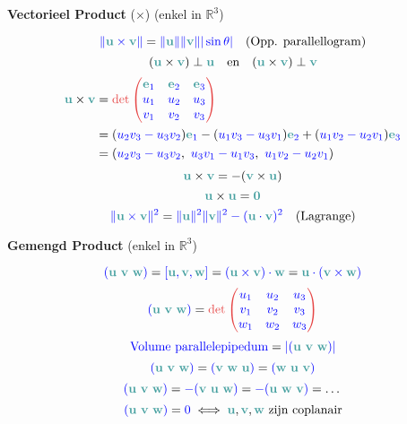 \documentclass[12pt]{article}
\renewcommand{\vec}[1]{\textcolor{vectorTeal}{\mathbf{#1}}}
\newcommand{\evec}[1]{\vec{e}_{\textcolor{scalarBrightBlue}{#1}}}
\newcommand{\scalar}[1]{\textcolor{scalarBrightBlue}{#1}}
\newcommand{\mat}[1]{\textcolor{matrixSoftRed}{#1}}
\begin{document}
\vspace{1.5em} %
{\centering
\textcolor{headerBrown}{\large\textbf{Vectorieel Product} ($\times$) (enkel in $\mathbb{R}^3$)}
\par
}%
\[
\scalar{\|\vec{u} \times \vec{v}\|} = \scalar{\|\vec{u}\| \|\vec{v}\| |\sin \theta|} \quad (\text{Opp. parallellogram})
\]
\[
(\vec{u} \times \vec{v}) \perp \vec{u} \quad \text{en} \quad (\vec{u} \times \vec{v}) \perp \vec{v}
\]
\begin{align*}
\vec{u} \times \vec{v} &= \mat{\det \begin{pmatrix} \evec{1} & \evec{2} & \evec{3} \\ \scalar{u_1} & \scalar{u_2} & \scalar{u_3} \\ \scalar{v_1} & \scalar{v_2} & \scalar{v_3} \end{pmatrix}} \\
&= (\scalar{u_2 v_3 - u_3 v_2})\evec{1} - (\scalar{u_1 v_3 - u_3 v_1})\evec{2} + (\scalar{u_1 v_2 - u_2 v_1})\evec{3} \\
&= (\scalar{u_2 v_3 - u_3 v_2}, \ \scalar{u_3 v_1 - u_1 v_3}, \ \scalar{u_1 v_2 - u_2 v_1})
\end{align*}
\[
\vec{u} \times \vec{v} = -(\vec{v} \times \vec{u})
\]
\[
\vec{u} \times \vec{u} = \vec{0}
\]
\[
\scalar{\|\vec{u} \times \vec{v}\|^2} = \scalar{\|\vec{u}\|^2 \|\vec{v}\|^2 - (\vec{u} \cdot \vec{v})^2} \quad (\text{Lagrange})
\]

\vspace{1.5em} %
{\centering
\textcolor{headerBrown}{\large\textbf{Gemengd Product} (enkel in $\mathbb{R}^3$)}
\par
}%
\[
\scalar{(\vec{u}\ \vec{v}\ \vec{w})} = \scalar{[\vec{u}, \vec{v}, \vec{w}]} = \scalar{(\vec{u} \times \vec{v}) \cdot \vec{w}} = \scalar{\vec{u} \cdot (\vec{v} \times \vec{w})}
\]
\[
\scalar{(\vec{u}\ \vec{v}\ \vec{w})} = \mat{\det \begin{pmatrix} \scalar{u_1} & \scalar{u_2} & \scalar{u_3} \\ \scalar{v_1} & \scalar{v_2} & \scalar{v_3} \\ \scalar{w_1} & \scalar{w_2} & \scalar{w_3} \end{pmatrix}}
\]
\[
\scalar{\text{Volume parallelepipedum}} = \scalar{|(\vec{u}\ \vec{v}\ \vec{w})|}
\]
\[
\scalar{(\vec{u}\ \vec{v}\ \vec{w})} = \scalar{(\vec{v}\ \vec{w}\ \vec{u})} = \scalar{(\vec{w}\ \vec{u}\ \vec{v})}
\]
\[
\scalar{(\vec{u}\ \vec{v}\ \vec{w})} = \scalar{-(\vec{v}\ \vec{u}\ \vec{w})} = \scalar{-(\vec{u}\ \vec{w}\ \vec{v})} = \dots
\]
\[
\scalar{(\vec{u}\ \vec{v}\ \vec{w})} = \scalar{0} \iff \vec{u}, \vec{v}, \vec{w} \text{ zijn coplanair}
\]
\end{document}
